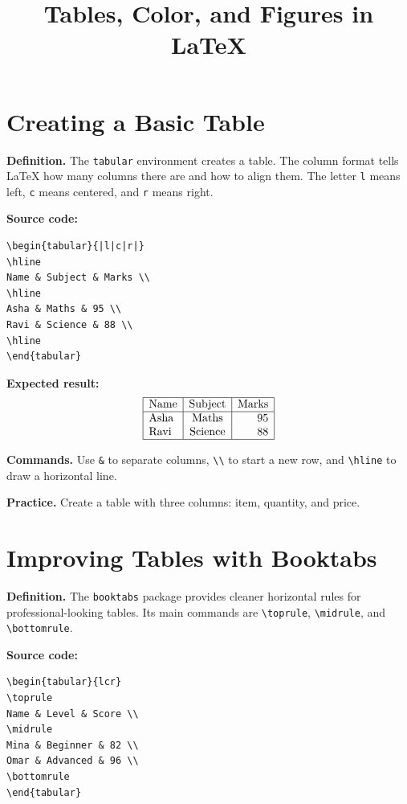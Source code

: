\documentclass[11pt]{article}
\title{Tables, Color, and Figures in LaTeX}
\author{}
\date{}
\begin{document}
\maketitle
\tableofcontents
\bigskip

\section{Creating a Basic Table}
\textbf{Definition.} The \texttt{tabular} environment creates a table. The column format tells LaTeX how many columns there are and how to align them. The letter \texttt{l} means left, \texttt{c} means centered, and \texttt{r} means right.

\textbf{Source code:}
\begin{verbatim}
\begin{tabular}{|l|c|r|}
\hline
Name & Subject & Marks \\
\hline
Asha & Maths & 95 \\
Ravi & Science & 88 \\
\hline
\end{tabular}
\end{verbatim}

\textbf{Expected result:}
\[
\begin{array}{|l|c|r|}
\hline
\text{Name} & \text{Subject} & \text{Marks}\\
\hline
\text{Asha} & \text{Maths} & 95\\
\text{Ravi} & \text{Science} & 88\\
\hline
\end{array}
\]

\textbf{Commands.} Use \texttt{\&} to separate columns, \texttt{\textbackslash\textbackslash} to start a new row, and \texttt{\textbackslash hline} to draw a horizontal line.

\textbf{Practice.} Create a table with three columns: item, quantity, and price.

\section{Improving Tables with Booktabs}
\textbf{Definition.} The \texttt{booktabs} package provides cleaner horizontal rules for professional-looking tables. Its main commands are \texttt{\textbackslash toprule}, \texttt{\textbackslash midrule}, and \texttt{\textbackslash bottomrule}.

\textbf{Source code:}
\begin{verbatim}
\begin{tabular}{lcr}
\toprule
Name & Level & Score \\
\midrule
Mina & Beginner & 82 \\
Omar & Advanced & 96 \\
\bottomrule
\end{tabular}
\end{verbatim}
\end{document}
